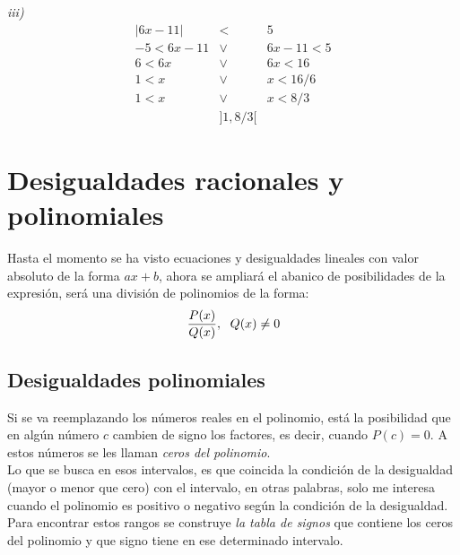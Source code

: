 \textit{iii)}\\
\begin{eqnarray*}
|6x-11| &<& 5 \\
-5< 6x-11 &\vee & 6x-11<5\\
6< 6x &\vee & 6x<16\\
1< x &\vee & x<16/6\\
1< x &\vee & x<8/3\\
& ]1,8/3[ &
\end{eqnarray*}

\section{Desigualdades racionales y polinomiales}
Hasta el momento se ha visto ecuaciones y desigualdades lineales con valor absoluto de la forma $ax+b$, ahora se ampliará el abanico de posibilidades	de la expresión, será una división de polinomios de la forma:
\begin{eqnarray*}
\dfrac{P(x)}{Q(x)}, \hspace{6px} Q(x)\neq 0
\end{eqnarray*}

\subsection{Desigualdades polinomiales}

Si se va reemplazando los números reales en el polinomio, está la posibilidad que en algún número $c$ cambien de signo los factores, es decir, cuando $P(c)=0$. A estos números se les llaman \textit{ceros del polinomio}.\\
Lo que se busca en esos intervalos, es que coincida la condición de la desigualdad (mayor o menor que cero) con el intervalo, en otras palabras, solo me interesa cuando el polinomio es positivo o negativo según la condición de la desigualdad. Para encontrar estos rangos se construye \textit{la tabla de signos} que contiene los ceros del polinomio y que signo tiene en ese determinado intervalo.\\

